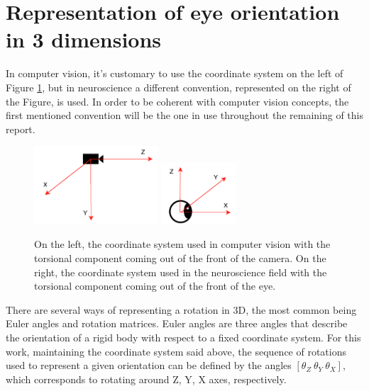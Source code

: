 \section{Representation of eye orientation in 3 dimensions}
\label{cha2:represent}
In computer vision, it's customary to use the coordinate system on the left of Figure \ref{cha2:sec2:fig:coordsys2}, but in neuroscience a different convention, represented on the right of the Figure, is used. In order to be coherent with computer vision concepts, the first mentioned convention will be the one in use throughout the remaining of this report.

\begin{figure}[!htb]
	\centering
	\includegraphics[width=0.41\textwidth]{images/cvcoordinatesys.pdf}
	\includegraphics[width=0.25\textwidth]{images/cvcoordinatesysq.pdf}
	\caption[Computer Vision vs Neuroscience coordinate systems]{On the left, the coordinate system used in computer vision with the torsional component coming out of the front of the camera. On the right, the coordinate system used in the neuroscience field with the torsional component coming out of the front of the eye.}
	\label{cha2:sec2:fig:coordsys2}
\end{figure}

There are several ways of representing a rotation in 3D, the most common being Euler angles and rotation matrices. Euler angles are three angles that describe the orientation of a rigid body with respect to a fixed coordinate system. For this work, maintaining the coordinate system said above, the sequence of rotations used to represent a given orientation can be defined by the angles $[\theta_Z \ \theta_Y \ \theta_X]$, which corresponds to rotating around Z, Y, X axes, respectively.


